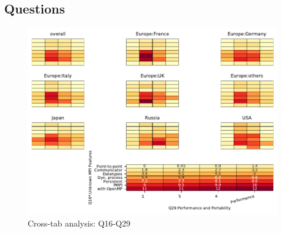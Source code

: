 
\subsection{Questions}


\begin{figure}
\begin{center}
\includegraphics[width=12cm]{../pdfs/Q16-Q29.pdf}
\caption{Cross-tab analysis: Q16-Q29}
\label{fig:Q16-Q29}
\end{center}
\end{figure}
